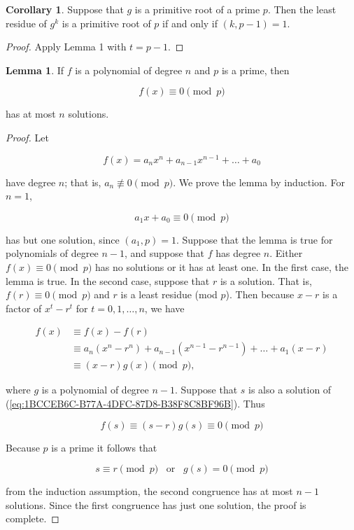 \documentclass{article}
\theoremstyle{definition} %
\theoremstyle{definition}
\newtheorem{corollary}{Corollary}[section] %
\theoremstyle{definition}
\newtheorem{lemma}{Lemma}[section]
\theoremstyle{definition}
\begin{document}
  \begin{corollary}
    Suppose that $g$ is a primitive root of a prime $p$. Then the least residue of
    $g^k$ is a primitive root of $p$ if and only if $(k, p - 1) = 1$.
  \end{corollary}
  
  \begin{proof}
    Apply Lemma 1 with $t = p - 1$.
  \end{proof}
  
  \begin{lemma}
    If $f$ is a polynomial of degree $n$ and $p$ is a prime, then
    
    \begin{equation}
      f(x) \equiv 0 \pmod{p} \label{eq:1BCCEB6C-B77A-4DFC-87D8-B38F8C8BF96B}
    \end{equation}
    
    has at most $n$ solutions.
  \end{lemma}
  
  \begin{proof}
    Let
    
    \[ f(x) = a_nx^n + a_{n - 1}x^{n - 1}+\dots+a_0 \]
    
    have degree $n$; that is, $a_n \nequiv 0 \pmod{p}$. We prove the lemma
    by induction. For $n = 1$,
    
    \[ a_1x + a_0 \equiv 0 \pmod{p} \]
    
    has but one solution, since $(a_1, p) = 1$. Suppose that the lemma is true
    for polynomials of degree $n - 1$, and suppose that $f$ has degree $n$.
    Either $f(x) \equiv 0 \pmod{p}$ has no solutions or it has at least one. In the
    first case, the lemma is true. In the second case, suppose that $r$ is a solution.
    That is, $f(r) \equiv 0 \pmod{p}$ and $r$ is a least residue (mod $p$). Then
    because $x - r$ is a factor of $x^t - r^t$ for $t = 0, 1, \dots, n$, we have
    
    \begin{align*}
      f(x) &\equiv f(x) - f(r) \\
        &\equiv a_n(x^n - r^n) + a_{n - 1}(x^{n - 1} - r^{n - 1}) + \dots + a_1(x - r) \\
        &\equiv (x - r)g(x) \pmod{p},
    \end{align*}
    
    where $g$ is a polynomial of degree $n - 1$. Suppose that $s$ is also a solution
    of (\ref{eq:1BCCEB6C-B77A-4DFC-87D8-B38F8C8BF96B}). Thus
    
    \[ f(s) \equiv (s - r)g(s) \equiv 0 \pmod{p} \]
    
    Because $p$ is a prime it follows that
    
    \[ s \equiv r \pmod{p} \;\;\;\text{or}\;\;\; g(s) = 0 \pmod{p} \]
    
    from the induction assumption, the second congruence has at most $n - 1$ solutions.
    Since the first congruence has just one solution, the proof is complete.
  \end{proof}
  
\end{document}
